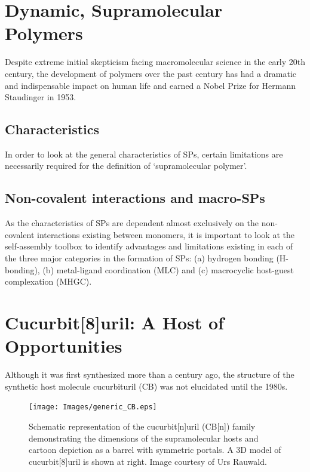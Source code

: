 \documentclass[a4wide,12pt]{report} %
\begin{document}

\section{Dynamic, Supramolecular Polymers}
\noindent
Despite extreme initial skepticism facing macromolecular science in the early 20th century, the development of polymers over the past century has had a dramatic and indispensable impact on human life and earned a Nobel Prize for Hermann Staudinger in 1953.\cite{Staudinger:1953p3048}



\subsection{Characteristics}
\noindent
In order to look at the general characteristics of SPs, certain limitations are necessarily required for the definition of `supramolecular polymer'. 





\subsection{Non-covalent interactions and macro-SPs}
\noindent
As the characteristics of SPs are dependent almost exclusively on the non-covalent interactions existing between monomers, it is important to look at the self-assembly toolbox to identify advantages and limitations existing in each of the three major categories in the formation of SPs: (a) hydrogen bonding (H-bonding), (b) metal-ligand coordination (MLC) and (c) macrocyclic host-guest complexation (MHGC).


\section{Cucurbit[8]uril: A Host of Opportunities}
\noindent
Although it was first synthesized more than a century ago,\cite{Behrend:1905p1004} the structure of the synthetic host molecule cucurbituril (CB) was not elucidated until the 1980s.\cite{Freeman:1981p990}

\vspace{0.25 in}
\begin{figure}[h]
\begin{center}
 \texttt{[image: Images/generic\_CB.eps]}
\vspace{0.1 in}
  \caption{Schematic representation of the cucurbit[n]uril (CB[n]) family demonstrating the dimensions of the supramolecular hosts and cartoon depiction as a barrel with symmetric portals. A 3D model of cucurbit[8]uril is shown at right. Image courtesy of Urs Rauwald.}\label{generic_CB}
\end{center}
\vspace{0.25 in}
\end{figure} 
\end{document}

